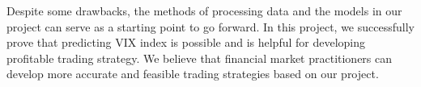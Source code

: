 \documentclass[fleqn,10pt]{SelfArx} %
\begin{document}
\noindent
Despite some drawbacks, the methods of processing data and the models in our project can serve as a starting point to go forward. In this project, we successfully prove that predicting VIX index is possible and is helpful for developing profitable trading strategy. We believe that financial market practitioners can develop more accurate and feasible trading strategies based on our project.










\end{document}
